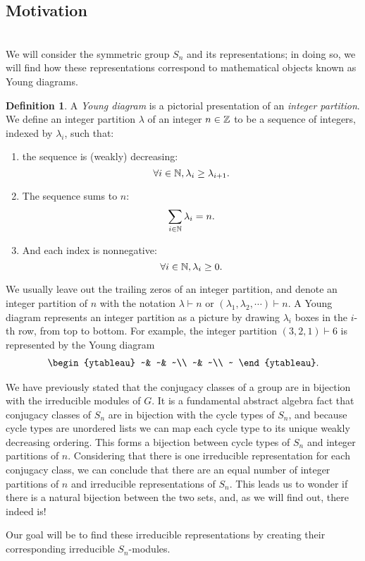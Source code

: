 \documentclass[12pt,twoside]{reedthesis}
\theoremstyle{plain}   %
\theoremstyle{definition}
\newtheorem{defn}{Definition}[section]
\theoremstyle{remark}
\numberwithin{equation}{section}
\begin{document}
  \subsection{Motivation}\label{motivation} \hfill\\
  We will consider the symmetric group $S_n$ and its representations; in doing so, we will find how these representations correspond to mathematical objects known as Young diagrams.
  \begin{defn}
    A \emph{Young diagram} is a pictorial presentation of an \emph{integer partition}.
    We define an integer partition $\lambda$ of an integer $n \in \mathbb{Z}$ to be a sequence of integers, indexed by $\lambda_i$, such that:
    \begin{enumerate}
    \item the sequence is (weakly) decreasing:
      \[\forall i \in \mathbb{N}, \lambda_i \geq \lambda_{i+1}.\]
    \item
      The sequence sums to $n$:
      \[ \sum_{i \in \mathbb{N}} \lambda_i = n. \]
    \item
      And each index is nonnegative:
      \[\forall i \in \mathbb{N}, \lambda_i \geq 0.\]
    \end{enumerate}
    We usually leave out the trailing zeros of an integer partition, and denote an integer partition of $n$ with the notation $\lambda \vdash n$ or $(\lambda_1,\lambda_2,\cdots) \vdash n$.
    A Young diagram represents an integer partition as a picture by drawing $\lambda_i$ boxes in the $i$-th row, from top to bottom.
    For example, the integer partition $(3,2,1) \vdash 6$ is represented by the Young diagram
    \[
      \begin{array}{@{}c@{}}
      \begin{ytableau}
        ~& ~& ~\\
        ~& ~\\
        ~
      \end{ytableau}
      \end{array}
      .
    \]
  \end{defn}
  \par
  We have previously stated that the conjugacy classes of a group are in bijection with the irreducible modules of $G$. It is a fundamental abstract algebra fact that 
  conjugacy classes of $S_n$ are in bijection with the cycle types of $S_n$,
  and because cycle types are unordered lists we can map each cycle type to its unique weakly decreasing ordering.
  This forms a bijection between cycle types of $S_n$ and integer partitions of $n$.
  Considering that there is one irreducible representation for each conjugacy class, we can conclude that there are an equal number of integer partitions of $n$ and irreducible representations of $S_n$.
  This leads us to wonder if there is a natural bijection between the two sets, and, as we will find out, there indeed is!
  \par
  Our goal will be to find these irreducible representations by creating their corresponding irreducible $S_n$-modules.
\end{document}
